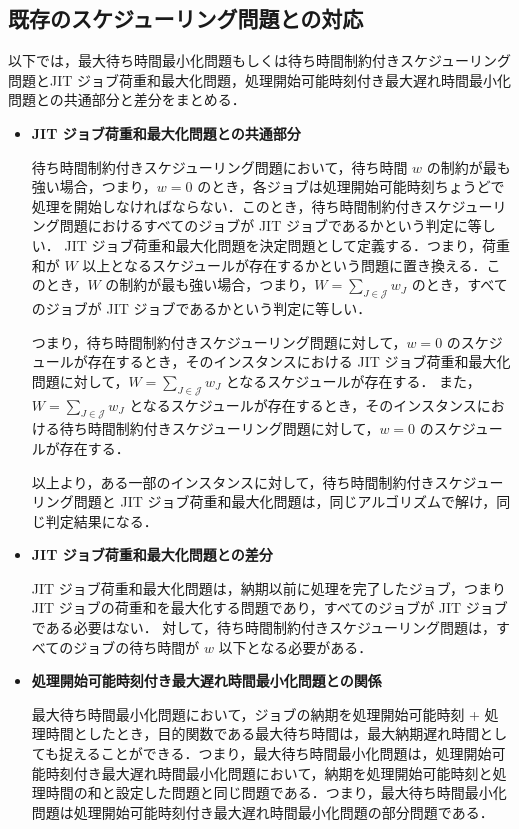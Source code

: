 \documentclass[12pt]{optlab-bachelor}
\begin{document}
\subsection{既存のスケジューリング問題との対応}
以下では，最大待ち時間最小化問題もしくは待ち時間制約付きスケジューリング問題とJIT ジョブ荷重和最大化問題，処理開始可能時刻付き最大遅れ時間最小化問題との共通部分と差分をまとめる．

\begin{itemize}
  \item \textbf{JIT ジョブ荷重和最大化問題との共通部分}

  待ち時間制約付きスケジューリング問題において，待ち時間 $w$ の制約が最も強い場合，つまり，$w = 0$ のとき，各ジョブは処理開始可能時刻ちょうどで処理を開始しなければならない．このとき，待ち時間制約付きスケジューリング問題におけるすべてのジョブが JIT ジョブであるかという判定に等しい．
  JIT ジョブ荷重和最大化問題を決定問題として定義する．つまり，荷重和が $W$ 以上となるスケジュールが存在するかという問題に置き換える．このとき，$W$ の制約が最も強い場合，つまり，$W = {\displaystyle \sum_{J \in \mathcal{J}}w_J}$ のとき，すべてのジョブが JIT  ジョブであるかという判定に等しい．

  つまり，待ち時間制約付きスケジューリング問題に対して，$w = 0$ のスケジュールが存在するとき，そのインスタンスにおける JIT ジョブ荷重和最大化問題に対して，$W = {\displaystyle \sum_{J \in \mathcal{J}}w_J}$ となるスケジュールが存在する．
  また，$W = {\displaystyle \sum_{J \in \mathcal{J}}w_J}$ となるスケジュールが存在するとき，そのインスタンスにおける待ち時間制約付きスケジューリング問題に対して，$w = 0$ のスケジュールが存在する．

  以上より，ある一部のインスタンスに対して，待ち時間制約付きスケジューリング問題と JIT ジョブ荷重和最大化問題は，同じアルゴリズムで解け，同じ判定結果になる．

  \item \textbf{JIT ジョブ荷重和最大化問題との差分}

  JIT ジョブ荷重和最大化問題は，納期以前に処理を完了したジョブ，つまり JIT ジョブの荷重和を最大化する問題であり，すべてのジョブが JIT ジョブである必要はない．
  対して，待ち時間制約付きスケジューリング問題は，すべてのジョブの待ち時間が $w$ 以下となる必要がある．

  \item \textbf{処理開始可能時刻付き最大遅れ時間最小化問題との関係}

  最大待ち時間最小化問題において，ジョブの納期を処理開始可能時刻 + 処理時間としたとき，目的関数である最大待ち時間は，最大納期遅れ時間としても捉えることができる．つまり，最大待ち時間最小化問題は，処理開始可能時刻付き最大遅れ時間最小化問題において，納期を処理開始可能時刻と処理時間の和と設定した問題と同じ問題である．つまり，最大待ち時間最小化問題は処理開始可能時刻付き最大遅れ時間最小化問題の部分問題である．
\end{itemize}
\end{document}
